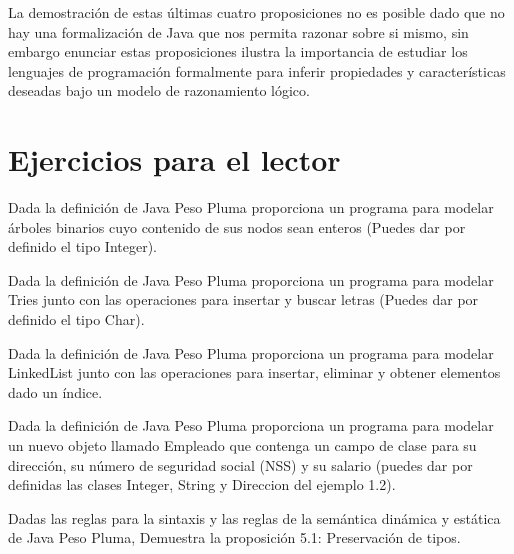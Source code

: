 La demostración de estas últimas cuatro proposiciones no es posible dado que no hay una formalización de \textsf{Java} que nos permita razonar sobre si mismo, sin embargo enunciar estas proposiciones ilustra la importancia de estudiar los lenguajes de programación formalmente para inferir propiedades y características deseadas bajo un modelo de razonamiento lógico.


\section{Ejercicios para el lector}

\begin{exercise}
    Dada la definición de \textsf{Java Peso Pluma} proporciona un programa para modelar árboles binarios cuyo contenido de sus nodos sean enteros (Puedes dar por definido el tipo \textsf{Integer}).
\end{exercise}




\begin{exercise}
    Dada la definición de \textsf{Java Peso Pluma} proporciona un programa para modelar Tries junto con las operaciones para insertar y buscar letras (Puedes dar por definido el tipo \textsf{Char}).
\end{exercise}



\begin{exercise}
    Dada la definición de \textsf{Java Peso Pluma} proporciona un programa para modelar LinkedList junto con las operaciones para insertar, eliminar y obtener elementos dado un índice.
\end{exercise}



\begin{exercise}
    Dada la definición de \textsf{Java Peso Pluma} proporciona un programa para modelar un nuevo objeto llamado \textsf{Empleado} que contenga un campo de clase para su dirección, su número de seguridad social (NSS) y su salario (puedes dar por definidas las clases \textsf{Integer, String y Direccion} del ejemplo 1.2).
\end{exercise}



\begin{exercise}
    Dadas las reglas para la sintaxis y las reglas de la semántica dinámica y estática de \textsf{Java Peso Pluma}, Demuestra la proposición 5.1: Preservación de tipos.
\end{exercise}



